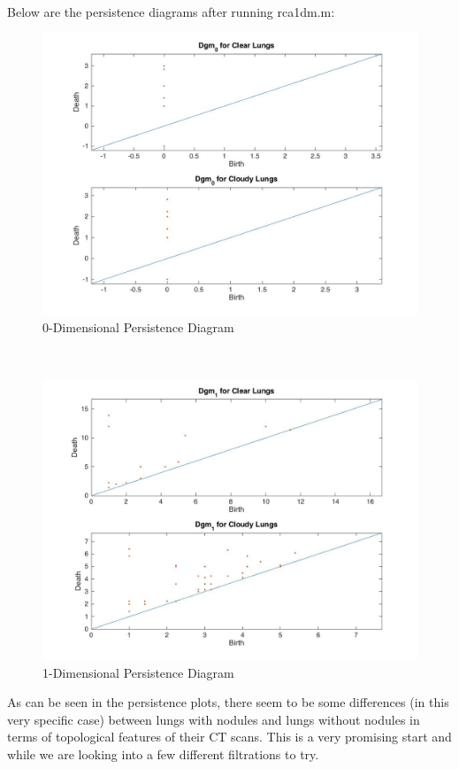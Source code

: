 \documentclass[12pt]{report}
\begin{document}
\\
Below are the persistence diagrams after running rca1dm.m:
\\
\begin{figure}[H]
\centering
	\includegraphics[width=0.8\linewidth]{tSdgm0.jpg}
	\caption{0-Dimensional Persistence Diagram}
\end{figure}\newline
\\
\begin{figure}[H]
\centering
	\includegraphics[width=0.8\linewidth]{tSdgm1.jpg}
	\caption{1-Dimensional Persistence Diagram}
\end{figure}\newline

As can be seen in the persistence plots, there seem to be some differences (in this very specific case) between lungs with nodules and lungs without nodules in terms of topological features of their CT scans. This is a very promising start and while we are looking into a few different filtrations to try.\newline
\\
\end{document}
